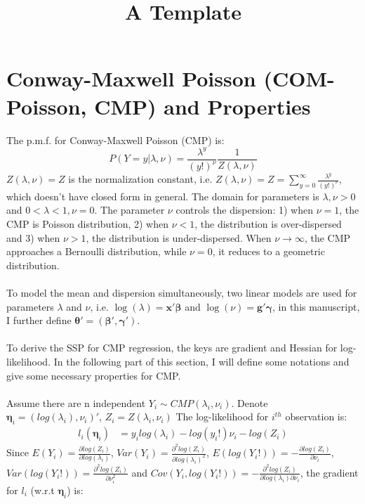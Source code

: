 \documentclass[]{article}
\title{A Template}
\begin{document}
	
\section{Conway-Maxwell Poisson (COM-Poisson, CMP) and Properties}
The p.m.f. for Conway-Maxwell Poisson (CMP) is:
\begin{equation*}
	P(Y = y|\lambda, \nu) = \frac{\lambda^{y}}{(y!)^{\nu}}\frac{1}{Z(\lambda, \nu)}
\end{equation*}
$Z(\lambda, \nu) = Z$ is the normalization constant, i.e. $Z(\lambda, \nu) = Z = \sum_{y=0}^{\infty}\frac{\lambda^{y}}{(y!)^{\nu}}$, which doesn't have closed form in general. The domain for parameters is $\lambda, \nu > 0$ and $0 < \lambda < 1, \nu = 0$. The parameter $\nu$ controls the dispersion: 1) when $\nu = 1$, the CMP is Poisson distribution, 2) when $\nu < 1$, the distribution is over-dispersed and 3) when $\nu > 1$, the distribution is under-dispersed. When $\nu\to\infty$, the CMP approaches a Bernoulli distribution, while $\nu=0$, it reduces to a geometric distribution.\\
\\
To model the mean and dispersion simultaneously, two linear models are used for parameters $\lambda$ and $\nu$, i.e. $\log(\lambda) = \boldsymbol{x}'\boldsymbol{\beta}$ and $\log(\nu) = \boldsymbol{g}'\boldsymbol{\gamma}$, in this manuscript, I further define $\boldsymbol{\theta}' = (\boldsymbol{\beta}', \boldsymbol{\gamma}')$.\\
\\
To derive the SSP for CMP regression, the keys are gradient and Hessian for log-likelihood. In the following part of this section, I will define some notations and give some necessary properties for CMP.\\
\\
Assume there are n independent $Y_i \sim CMP(\lambda_i, \nu_i)$. Denote $\boldsymbol{\eta}_i = (log(\lambda_i), \nu_i)'$, $Z_i = Z(\lambda_i, \nu_i)$ The log-likelihood for $i^{th}$ observation is:
\begin{align*}
	l_i(\boldsymbol{\eta}_i) &=  y_i log(\lambda_i) - log(y_i!)\nu_i - log(Z_i)
\end{align*}
Since $E(Y_i) = \frac{\partial log(Z_i)}{\partial log(\lambda_i)}$, $Var(Y_i) = \frac{\partial^2 log(Z_i)}{\partial log(\lambda_i)^2}$, $E(log(Y_i!)) = -\frac{\partial log(Z_i)}{\partial \nu_i}$, $Var(log(Y_i!)) = \frac{\partial^2 log(Z_i)}{\partial \nu_i^2}$ and $Cov(Y_i, log(Y_i!)) = -\frac{\partial^2log(Z_i)}{\partial log(\lambda_i) \partial \nu_i}$, the gradient for $l_i$ (w.r.t $\boldsymbol{\eta}_i$) is:
\end{document}
